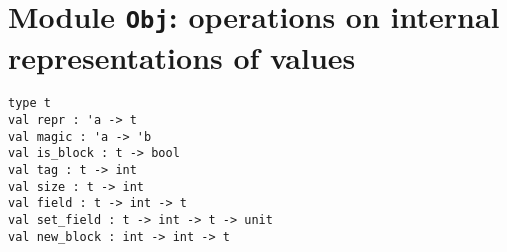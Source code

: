\section{Module {\tt Obj}: operations on internal representations of values
}

\label{s:Obj}
%

\begin{comment}
Not for the casual user. 
\end{comment}
\begin{verbatim}
type t
val repr : 'a -> t
val magic : 'a -> 'b
val is_block : t -> bool
val tag : t -> int
val size : t -> int
val field : t -> int -> t
val set_field : t -> int -> t -> unit
val new_block : int -> int -> t
\end{verbatim}
%
%
%
%
%
%
%
%

